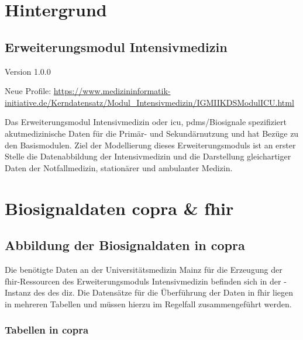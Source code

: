 \chapter{Hintergrund} \label{ch:backg}

\section{Erweiterungsmodul Intensivmedizin} \label{sec:icu}

Version 1.0.0

\noindent Neue Profile: \url{https://www.medizininformatik-initiative.de/Kerndatensatz/Modul_Intensivmedizin/IGMIIKDSModulICU.html}


Das Erweiterungsmodul Intensivmedizin oder \ac{icu}, \acs{pdms}/Biosignale spezifiziert akutmedizinische Daten für die Primär- und Sekundärnutzung und hat Bezüge zu den Basismodulen. Ziel der Modellierung dieses Erweiterungsmoduls ist an erster Stelle die Datenabbildung der Intensivmedizin und die Darstellung gleichartiger Daten der Notfallmedizin, stationärer und ambulanter Medizin.

\chapter{Biosignaldaten \acs{copra} \& \acs{fhir}} \label{ch:coprafhir}

\section{Abbildung der Biosignaldaten in \acs{copra}} \label{sec:copra}

Die benötigte Daten an der Universitätsmedizin Mainz für die Erzeugung der \ac{fhir}-Ressourcen des Erweiterungsmoduls Intensivmedizin befinden sich in der -Instanz des  des \ac{diz}. Die Datensätze für die Überführung der Daten in \ac{fhir} liegen in mehreren Tabellen und müssen hierzu im Regelfall zusammengeführt werden.

\subsection{Tabellen in \acs{copra}} \label{subsec:copratab}

